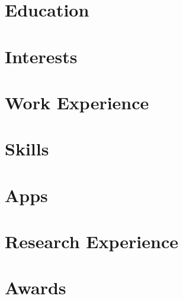 \documentclass[10pt,a4paper]{mycv}
\begin{document}
\cfoot{\sansc \thepage}
\makecvtitle


\section{Education}


\section{Interests}


\section{Work Experience}


\section{Skills}


\section{Apps}


\section{Research Experience}


\section{Awards}

\end{document}
